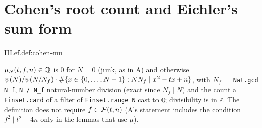 \section{Cohen's root count and Eichler's sum form}\label{sec:ef-cohen}

\begin{definition}
\end{definition}
\begin{tfformal}{III.ef.def:cohen-mu}
\begin{tffidelity}
$\mu_N(t,f,n)\in\mathbb{Q}$ is $0$ for $N=0$ (junk, as in A) and otherwise $\psi(N)/\psi(N/N_f)\cdot\#\{x\in\{0,\dots,N-1\}:NN_f\mid x^2-tx+n\}$, with $N_f=$ \texttt{Nat.gcd N f}, \texttt{N / N\_f} natural-number division (exact since $N_f\mid N$) and the count a \texttt{Finset.card} of a filter of \texttt{Finset.range N} cast to \texttt{ℚ}; divisibility is in \texttt{ℤ}. The definition does not require $f\in\mathcal{F}(t,n)$ (A's statement includes the condition $f^2\mid t^2-4n$ only in the lemmas that use $\mu$).
\end{tffidelity}
\end{tfformal}

